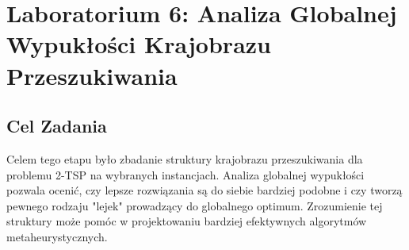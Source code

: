 \documentclass[12pt,a4paper]{article}
\begin{document}
\section{Laboratorium 6: Analiza Globalnej Wypukłości Krajobrazu Przeszukiwania}
\label{sec:lab6}

\subsection{Cel Zadania}
Celem tego etapu było zbadanie struktury krajobrazu przeszukiwania dla problemu 2-TSP na wybranych instancjach. Analiza globalnej wypukłości pozwala ocenić, czy lepsze rozwiązania są do siebie bardziej podobne i czy tworzą pewnego rodzaju "lejek" prowadzący do globalnego optimum. Zrozumienie tej struktury może pomóc w projektowaniu bardziej efektywnych algorytmów metaheurystycznych.
\end{document}
